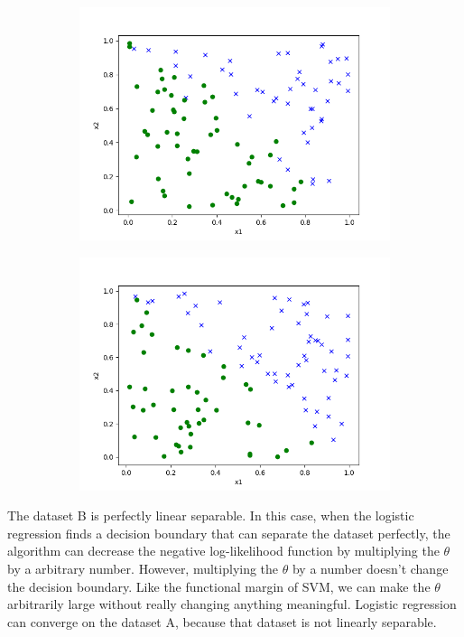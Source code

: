 \begin{answer}
\begin{figure}[htb]
    \begin{subfigure}{0.5\linewidth}
        \centering
        \includegraphics[width=\linewidth]{tex/a.png}
    \end{subfigure}
    \begin{subfigure}{0.5\linewidth}
        \centering
        \includegraphics[width=\linewidth]{tex/b.png}
    \end{subfigure}
    
\end{figure}
The dataset B is perfectly linear separable. In this case, when the logistic regression finds a decision boundary that can separate the dataset perfectly, the algorithm can decrease the negative log-likelihood function by multiplying the $\theta$ by a arbitrary number. However, multiplying the $\theta$ by a number doesn't change the decision boundary. Like the functional margin of SVM, we can make the $\theta$ arbitrarily large without really changing anything meaningful. 
Logistic regression can converge on the dataset A, because that dataset is not linearly separable.
\end{answer}
